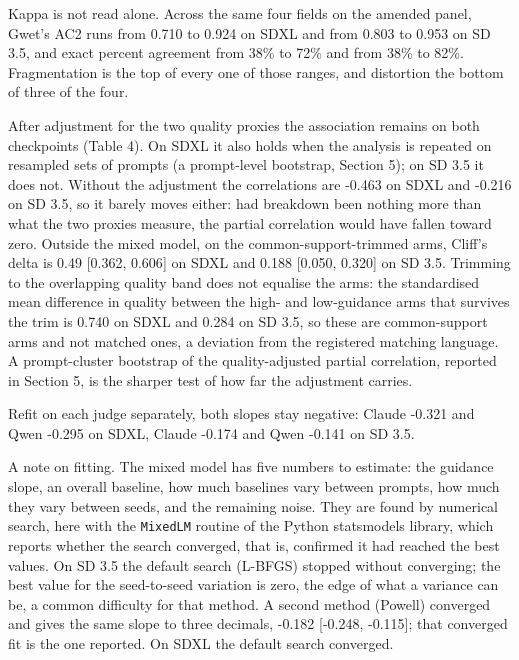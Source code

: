 \documentclass[11pt]{article}
\begin{document}
Kappa is not read alone. Across the same four fields on the amended panel,
Gwet's AC2 runs from 0.710 to 0.924 on SDXL and from 0.803 to 0.953 on SD 3.5,
and exact percent agreement from 38\% to 72\% and from 38\% to 82\%.
Fragmentation is the top of every one of those ranges, and distortion the bottom
of three of the four.

After adjustment for the two quality proxies the association remains on both
checkpoints (Table 4). On SDXL it also holds when the analysis is repeated on
resampled sets of prompts (a prompt-level bootstrap, Section 5); on SD 3.5 it
does not. Without the adjustment the correlations are -0.463 on SDXL and -0.216
on SD 3.5, so it barely moves either: had breakdown been nothing more than what
the two proxies measure, the partial correlation would have fallen toward zero.
Outside the mixed model, on the common-support-trimmed arms, Cliff's delta is
0.49 {[}0.362, 0.606{]} on SDXL and 0.188 {[}0.050, 0.320{]} on SD 3.5. Trimming
to the overlapping quality band does not equalise the arms: the standardised
mean difference in quality between the high- and low-guidance arms that survives
the trim is 0.740 on SDXL and 0.284 on SD 3.5, so these are common-support arms
and not matched ones, a deviation from the registered matching language. A
prompt-cluster bootstrap of the quality-adjusted partial correlation, reported
in Section 5, is the sharper test of how far the adjustment carries.

Refit on each judge separately, both slopes stay negative: Claude -0.321 and
Qwen -0.295 on SDXL, Claude -0.174 and Qwen -0.141 on SD 3.5.

A note on fitting. The mixed model has five numbers to estimate: the guidance
slope, an overall baseline, how much baselines vary between prompts, how much
they vary between seeds, and the remaining noise. They are found by numerical
search, here with the \texttt{MixedLM} routine of the Python statsmodels
library, which reports whether the search converged, that is, confirmed it had
reached the best values. On SD 3.5 the default search (L-BFGS) stopped without
converging; the best value for the seed-to-seed variation is zero, the edge of
what a variance can be, a common difficulty for that method. A second method
(Powell) converged and gives the same slope to three decimals, -0.182 {[}-0.248,
-0.115{]}; that converged fit is the one reported. On SDXL the default search
converged.
\end{document}
